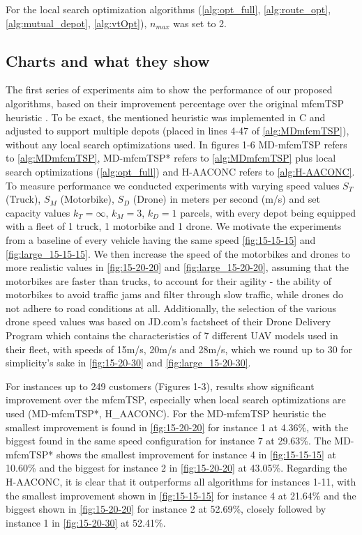 \documentclass{article}
\begin{document}
	For the local search optimization algorithms (\ref{alg:opt_full}, \ref{alg:route_opt}, \ref{alg:mutual_depot}, \ref{alg:vtOpt}), $n_{max}$ was set to 2.
	\par
	\subsection{Charts and what they show}
	The first series of experiments aim to show the performance of our proposed algorithms, based on their improvement percentage over the original mfcmTSP heuristic \cite{Oikonomou2021}. To be exact, the mentioned heuristic was implemented in C and adjusted to support multiple depots (placed in lines 4-47 of \autoref{alg:MDmfcmTSP}), without any local search optimizations used. In figures 1-6 MD-mfcmTSP refers to \autoref{alg:MDmfcmTSP}, MD-mfcmTSP* refers to \autoref{alg:MDmfcmTSP} plus local search optimizations (\autoref{alg:opt_full}) and H-AACONC refers to \autoref{alg:H-AACONC}. To measure performance we conducted experiments with varying speed values $S_T$ (Truck), $S_M$ (Motorbike), $S_D$ (Drone) in meters per second (m/s) and set capacity values $k_T=\infty$, $k_M=3$, $k_D=1$ parcels, with every depot being equipped with a fleet of 1 truck, 1 motorbike and 1 drone. We motivate the experiments from a baseline of every vehicle having the same speed \autoref{fig:15-15-15} and \autoref{fig:large_15-15-15}. 
	We then increase the speed of the motorbikes and drones to more realistic values in \autoref{fig:15-20-20} and \autoref{fig:large_15-20-20}, assuming that the motorbikes are faster than trucks, to account for their agility - the ability of motorbikes to avoid traffic jams and filter through slow traffic, while drones do not adhere to road conditions at all. Additionally, the selection of the various drone speed values was based on JD.com's factsheet of their Drone Delivery Program \autocite{JDcom} which contains the characteristics of 7 different UAV models used in their fleet, with speeds of 15m/s, 20m/s and 28m/s, which we round up to 30 for simplicity's sake in \autoref{fig:15-20-30} and \autoref{fig:large_15-20-30}.
	\par 
	For instances up to 249 customers (Figures 1-3), results show significant improvement over the mfcmTSP, especially when local search optimizations are used (MD-mfcmTSP*, H\_AACONC). For the MD-mfcmTSP heuristic the smallest improvement is found in \autoref{fig:15-20-20} for instance 1 at 4.36\%, with the biggest found in the same speed configuration for instance 7 at 29.63\%. The MD-mfcmTSP* shows the smallest improvement for instance 4 in \autoref{fig:15-15-15} at 10.60\% and the biggest for instance 2 in \autoref{fig:15-20-20} at 43.05\%. Regarding the H-AACONC, it is clear that it outperforms all algorithms for instances 1-11, with the smallest improvement shown in \autoref{fig:15-15-15} for instance 4 at 21.64\% and the biggest shown in \autoref{fig:15-20-20} for instance 2 at 52.69\%, closely followed by instance 1 in \autoref{fig:15-20-30} at 52.41\%.
\end{document}

